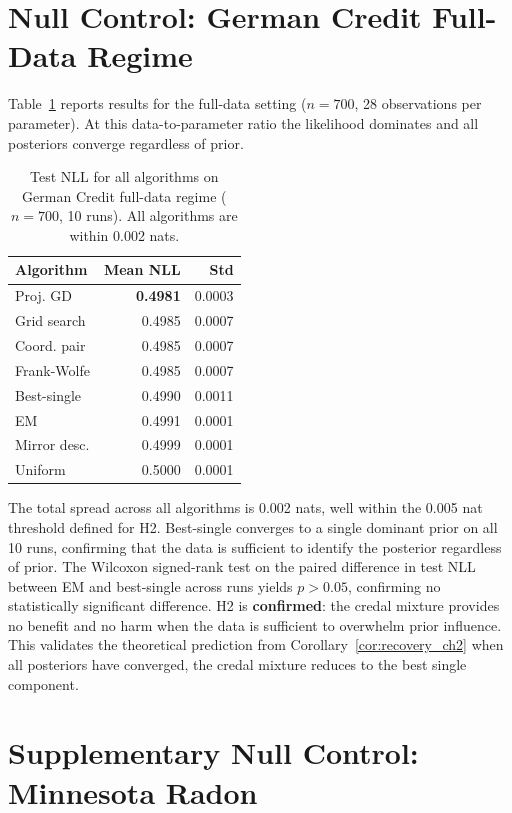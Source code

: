 \section{Null Control: German Credit 
Full-Data Regime}
\label{sec:null_control}

Table~\ref{tab:german_full} reports 
results for the full-data setting 
($n = 700$, 28 observations per 
parameter). At this data-to-parameter 
ratio the likelihood dominates and 
all posteriors converge regardless 
of prior.

\begin{table}[h]
\centering
\caption{Test NLL for all algorithms 
on German Credit full-data regime 
($n = 700$, 10 runs). All algorithms 
are within 0.002 nats.}
\label{tab:german_full}
{\singlespacing
\begin{tabular}{lrr}
\hline
Algorithm & Mean NLL & Std \\
\hline
Proj. GD    & \textbf{0.4981} & 0.0003 \\
Grid search & 0.4985 & 0.0007 \\
Coord. pair & 0.4985 & 0.0007 \\
Frank-Wolfe & 0.4985 & 0.0007 \\
Best-single & 0.4990 & 0.0011 \\
EM          & 0.4991 & 0.0001 \\
Mirror desc.& 0.4999 & 0.0001 \\
Uniform     & 0.5000 & 0.0001 \\
\hline
\end{tabular}}
\end{table}

The total spread across all algorithms 
is 0.002 nats, well within the 0.005 
nat threshold defined for H2. Best-single 
converges to a single dominant prior 
on all 10 runs, confirming that the 
data is sufficient to identify the 
posterior regardless of prior. The 
Wilcoxon signed-rank test on the 
paired difference in test NLL between 
EM and best-single across runs yields 
$p > 0.05$, confirming no statistically 
significant difference. H2 is 
\textbf{confirmed}: the credal mixture 
provides no benefit and no harm when 
the data is sufficient to overwhelm 
prior influence. This validates the 
theoretical prediction from 
Corollary~\ref{cor:recovery_ch2} 
when all posteriors have converged, 
the credal mixture reduces to the 
best single component.

\section{Supplementary Null Control: 
Minnesota Radon}
\label{sec:radon}

